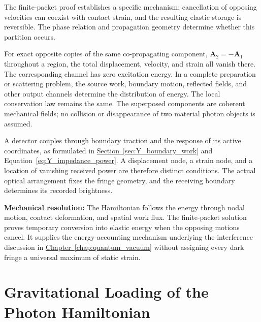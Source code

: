 The finite-packet proof establishes a specific mechanism: cancellation of opposing velocities can coexist with contact strain, and the resulting elastic storage is reversible. The phase relation and propagation geometry determine whether this partition occurs.

For exact opposite copies of the same co-propagating component, $\mathbf A_2=-\mathbf A_1$ throughout a region, the total displacement, velocity, and strain all vanish there. The corresponding channel has zero excitation energy. In a complete preparation or scattering problem, the source work, boundary motion, reflected fields, and other output channels determine the distribution of energy. The local conservation law remains the same. The superposed components are coherent mechanical fields; no collision or disappearance of two material photon objects is assumed.

A detector couples through boundary traction and the response of its active coordinates, as formulated in \hyperref[sec:Y_boundary_work]{Section~\ref*{sec:Y_boundary_work}} and Equation~\eqref{eq:Y_impedance_power}. A displacement node, a strain node, and a location of vanishing received power are therefore distinct conditions. The actual optical arrangement fixes the fringe geometry, and the receiving boundary determines its recorded brightness.

\noindent\textbf{Mechanical resolution:}
The Hamiltonian follows the energy through nodal motion, contact deformation, and spatial work flux. The finite-packet solution proves temporary conversion into elastic energy when the opposing motions cancel. It supplies the energy-accounting mechanism underlying the interference discussion in \hyperref[chap:quantum_vacuum]{Chapter~\ref*{chap:quantum_vacuum}} without assigning every dark fringe a universal maximum of static strain.

\section{Gravitational Loading of the Photon Hamiltonian}

